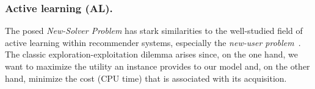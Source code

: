 \documentclass[runningheads]{llncs}
\begin{document}
\subsubsection{Active learning (AL).}
The posed \emph{New-Solver Problem} has stark similarities to the well-studied field of active learning within recommender systems, especially the \emph{new-user problem}~\cite{RubensESK15}.
The classic exploration-exploitation dilemma arises since, on the one hand, we want to maximize the utility an instance provides to our model and, on the other hand, minimize the cost (CPU time) that is associated with its acquisition.
\end{document}
